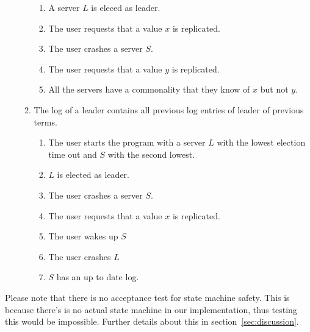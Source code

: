 \begin{itemize}
\begin{enumerate}
\begin{enumerate}
        \item A server $L$ is eleced as leader.
        \item The user requests that a value $x$ is replicated.
        \item The user crashes a server $S$.
        \item The user requests that a value $y$ is replicated.
        \item All the servers have a commonality that they know of $x$ but not $y$.
        \end{enumerate}
    \item The log of a leader contains all previous log entries of leader of previous terms.
        \begin{enumerate}
        \item The user starts the program with a server $L$ with the lowest election time out and $S$ with the second lowest.
        \item $L$ is elected as leader.
        \item The user crashes a server $S$.
        \item The user requests that a value $x$ is replicated.
        \item The user wakes up $S$
        \item The user crashes $L$
        \item $S$ has an up to date log.
        \end{enumerate}
    \end{enumerate}
\end{itemize}
Please note that there is no acceptance test for state machine safety. This is because there's is no actual state machine in our implementation, thus testing this would be impossible. Further details about this in section~\ref{sec:discussion}.

